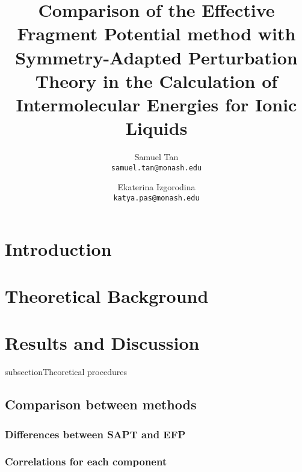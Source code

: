 \documentclass[final]{article}
\title{Comparison of the Effective Fragment Potential method with Symmetry-Adapted Perturbation Theory in the Calculation of Intermolecular Energies for Ionic Liquids}
\date{}
\author{Samuel Tan\\
        \texttt{samuel.tan@monash.edu} 
        \and
        Ekaterina Izgorodina\\
        \texttt{katya.pas@monash.edu}
}
\begin{document}
%
\clearpage

\maketitle
\begin{multicols}{2}

\section{Introduction}


\section{Theoretical Background}


\section{Results and Discussion}


subsection{Theoretical procedures}


\subsection{Comparison between methods}
\subsubsection{Differences between SAPT and EFP}


\subsubsection{Correlations for each component}



\end{multicols}
\end{document}
